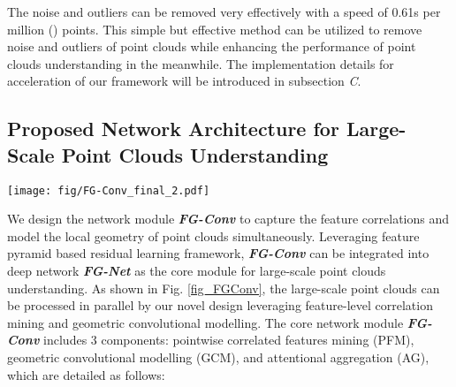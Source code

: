 \documentclass[journal]{IEEEtran}
\begin{document}
The noise and outliers can be removed very effectively with a speed of 0.61s per million () points. This simple but effective method can be utilized to remove noise and outliers of point clouds while enhancing the performance of point clouds understanding in the meanwhile. The implementation details for acceleration of our framework will be introduced in subsection \textit{C}.







\subsection{Proposed Network Architecture for Large-Scale Point Clouds Understanding}

 















\begin{figure*}[ht]
\centering
\texttt{[image: fig/FG-Conv\_final\_2.pdf]}

\caption{Detailed illustration of our proposed novel pointwise correlated feature and geometric convolutional modelling module (\textbf{\textit{FG-Conv Module}}), the deformable convolution operation is illustrated at the right bottom corner, with the query point denoted as  and the  neighbour point denoted as , the output vector of point convolution is the dot product of point features and kernel weights. The feature vector is summed in attentional aggregation.}
\label{fig_FGConv}
\end{figure*}
We design the network module \textbf{\textit{FG-Conv}} to capture the feature correlations and model the local geometry of point clouds simultaneously. Leveraging feature pyramid based residual learning framework, \textbf{\textit{FG-Conv}} can be integrated into deep network \textit{\textbf{FG-Net}} as the core module for large-scale point clouds understanding. As shown in Fig. \ref{fig_FGConv}, the large-scale point clouds can be processed in parallel by our novel design leveraging feature-level correlation mining and geometric convolutional modelling. The core network module \textbf{\textit{FG-Conv}} includes 3 components: pointwise correlated features mining (PFM), geometric convolutional modelling (GCM), and attentional aggregation (AG), which are detailed as follows:
\end{document}
